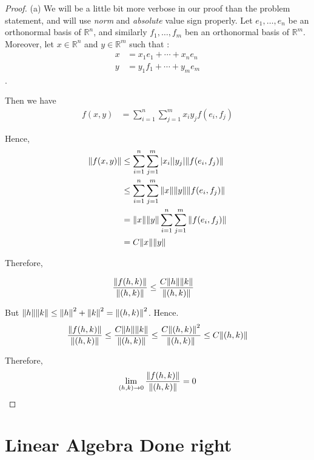 \documentclass[12pt]{book}
\begin{document}
\begin{proof}
  (a) We will be a little bit more verbose in our proof than the problem
  statement, and will use \emph{norm} and \emph{absolute} value sign
  properly. Let $e_1, \ldots, e_n$ be an orthonormal basis of $\mathbb{R}^n$,
  and similarly $f_1, \ldots, f_m$ ben an orthonormal basis of
  $\mathbb{R}^m$. Moreover, let $x \in \mathbb{R}^n$ and $y \in \mathbb{R}^m$
  such that :
  \begin{align*}
    x& = x_1 e_1 + \cdots + x_n e_n\\
    y& = y_1 f_1 + \cdots + y_m e_m
  \end{align*}.

  Then we have
  \begin{align*}
    f(x,y) & = \sum_{i=1}^n \sum_{j=1}^m x_i y_j f(e_i, f_j)
  \end{align*}

  Hence,
    \begin{align*}
      \norm{f(x,y)} & \le \sum_{i=1}^n \sum_{j=1}^m \abs{x_i} \abs{y_j} \norm{f(e_i, f_j)}\\
      & \le \sum_{i=1}^n \sum_{j=1}^m \norm{x} \norm{y} \norm{f(e_i, f_j)}\\
      & = \norm{x} \norm{y} \sum_{i=1}^n \sum_{j=1}^m  \norm{f(e_i, f_j)}\\
      & = C \norm{x} \norm{y}
    \end{align*}

    Therefore,

    \begin{align*}
      \frac{\norm{f(h,k)}}{\norm{(h,k)}} & \le \frac{C \norm{h} \norm{k}}{\norm{(h,k)}}
    \end{align*}

    But $\norm{h} \norm{k} \le \norm{h}^2 + \norm{k}^2 = {\norm{(h,k)}}^2$. Hence.
    \[
      \frac{\norm{f(h,k)}}{\norm{(h,k)}} \le \frac{C \norm{h} \norm{k}}{\norm{(h,k)}} \le \frac{C \norm{(h,k)}^2}{\norm{(h,k)}} \le C \norm{(h,k)}
      \]

    Therefore,
    \[
    \lim_{(h,k) \to 0} \frac{\norm{f(h,k)}}{\norm{(h,k)}} = 0
    \]
\end{proof}



%

\chapter{Linear Algebra Done right}
\end{document}
